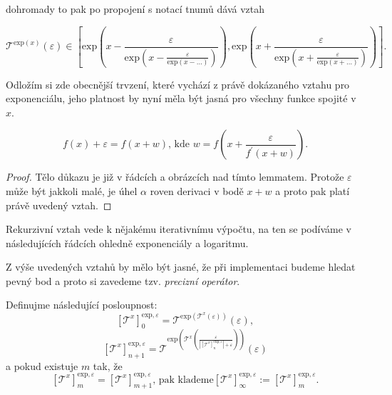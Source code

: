 dohromady to pak po propojení s notací tnumů dává vztah

\begin{equation}\label{rekpresexp3}
\mathcal{T}^{\mathrm{exp}(x)}(\varepsilon)\in\left[
\mathrm{exp}\left(x-\frac{\varepsilon}{\mathrm{exp}\left(x-\frac{\varepsilon}{\mathrm{exp}(x-\ldots)}\right)}\right), \mathrm{exp}\left(x+\frac{\varepsilon}{\mathrm{exp}\left(x+\frac{\varepsilon}{\mathrm{exp}(x+\ldots)}\right)}\right)\right].
\end{equation}

\begin{remark}
Odložím si zde obecnější trvzení, které vychází z právě dokázaného vztahu pro exponenciálu, jeho platnost by nyní měla být jasná pro všechny funkce spojité v $x$.
\begin{lemma}\label{lem:presprom}
\begin{equation}\label{eq:presprom}
f(x)+\varepsilon=f(x+w)\text{,~kde~}w=f\left(x+\frac{\varepsilon}{f^{'}(x+w)}\right).
\end{equation}
\begin{proof}
Tělo důkazu je již v řádcích a obrázcích nad tímto lemmatem. Protože $\varepsilon$ může být jakkoli malé, je úhel $\alpha$ roven derivaci v bodě $x+w$ a proto pak platí právě uvedený vztah.
\end{proof}
\end{lemma}
Rekurzivní vztah vede k nějakému iterativnímu výpočtu, na ten se podíváme v následujících řádcích ohledně exponenciály a logaritmu.
\end{remark}

Z výše uvedených vztahů by mělo být jasné, že při implementaci budeme hledat pevný bod a proto si zavedeme tzv. \textit{precizní operátor}.

\begin{definition}
Definujme následující posloupnost:
\begin{equation}
\left[ \mathcal{T}^x\right]_0^{\mathrm{exp},\varepsilon}=\mathcal{T}^{\mathrm{exp}(\mathcal{T}^x(\varepsilon))}(\varepsilon),
\end{equation}
\begin{equation}
\left[ \mathcal{T}^x\right]_{n+1}^{\mathrm{exp},\varepsilon}=\mathcal{T}^{\mathrm{exp}\left(\mathcal{T}^x\left(\frac{\varepsilon}{\left|\left[ \mathcal{T}^x\right]_n^{\mathrm{exp},\varepsilon}\right|+\varepsilon}\right)\right)}(\varepsilon)
\end{equation}
a pokud existuje $m$ tak, že
\begin{equation}
\left[\mathcal{T}^x\right]_m^{\mathrm{exp},\varepsilon} = \left[\mathcal{T}^x\right]_{m+1}^{\mathrm{exp},\varepsilon}\text{, pak klademe}\left[\mathcal{T}^x \right]_\infty^{\mathrm{exp},\varepsilon} := \left[\mathcal{T}^x\right]_m^{\mathrm{exp},\varepsilon}.
\end{equation}
\end{definition}

